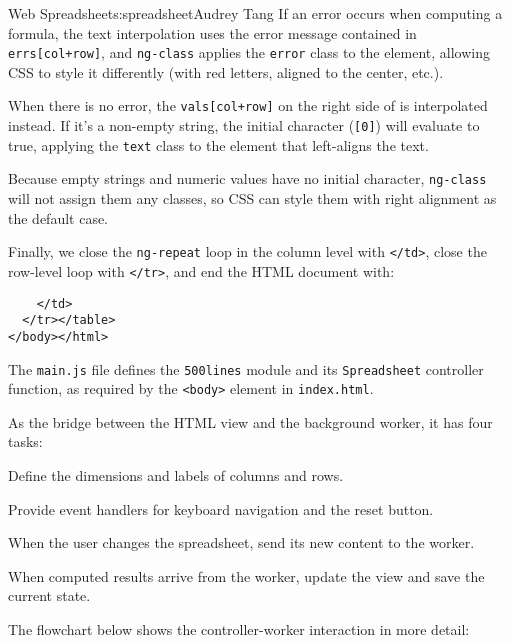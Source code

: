 \begin{aosachapter}{Web Spreadsheet}{s:spreadsheet}{Audrey Tang}
If an error occurs when computing a formula, the text interpolation uses
the error message contained in \texttt{errs{[}col+row{]}}, and
\texttt{ng-class} applies the \texttt{error} class to the element,
allowing CSS to style it differently (with red letters, aligned to the
center, etc.).

When there is no error, the \texttt{vals{[}col+row{]}} on the right side
of \texttt{\textbar{}\textbar{}} is interpolated instead. If it's a
non-empty string, the initial character (\texttt{{[}0{]}}) will evaluate
to true, applying the \texttt{text} class to the element that
left-aligns the text.

Because empty strings and numeric values have no initial character,
\texttt{ng-class} will not assign them any classes, so CSS can style
them with right alignment as the default case.

Finally, we close the \texttt{ng-repeat} loop in the column level with
\texttt{\textless{}/td\textgreater{}}, close the row-level loop with
\texttt{\textless{}/tr\textgreater{}}, and end the HTML document with:

\begin{verbatim}
    </td>
  </tr></table>
</body></html>
\end{verbatim}

\label{js-main-controller}

The \texttt{main.js} file defines the \texttt{500lines} module and its
\texttt{Spreadsheet} controller function, as required by the
\texttt{\textless{}body\textgreater{}} element in \texttt{index.html}.

As the bridge between the HTML view and the background worker, it has
four tasks:

\begin{aosaitemize}

\item
  Define the dimensions and labels of columns and rows.
\item
  Provide event handlers for keyboard navigation and the reset button.
\item
  When the user changes the spreadsheet, send its new content to the
  worker.
\item
  When computed results arrive from the worker, update the view and save
  the current state.
\end{aosaitemize}

The flowchart below shows the controller-worker interaction in more
detail:


\end{aosachapter}
